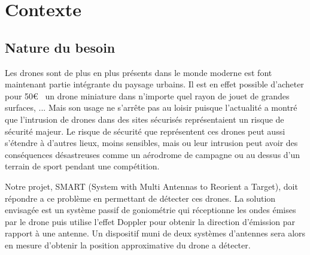
\chapter{Contexte}

\section{Nature du besoin}

Les drones sont de plus en plus présents dans le monde moderne est font maintenant partie intégrante du paysage urbains. Il est en effet possible d'acheter pour 50\euro~  un drone miniature dans n'importe quel rayon de jouet de grandes surfaces, ... %
Mais son usage ne s'arrête pas au loisir puisque l'actualité a montré que l'intrusion de drones dans des sites sécurisés représentaient un risque de sécurité majeur. Le risque de sécurité que représentent ces drones peut aussi s'étendre à d'autres lieux, moins sensibles, mais ou leur intrusion peut avoir des conséquences désastreuses comme un aérodrome de campagne ou au dessus d'un terrain de sport pendant une compétition.


Notre projet, SMART (System with Multi Antennas to Reorient a Target), doit répondre a ce problème en permettant de détecter ces drones. La solution envisagée est un système passif de goniométrie qui réceptionne les ondes émises par le drone puis utilise l'effet Doppler pour obtenir la direction d'émission par rapport à une antenne. Un dispositif muni de deux systèmes d'antennes sera alors en mesure d'obtenir la position approximative du drone a détecter. 




